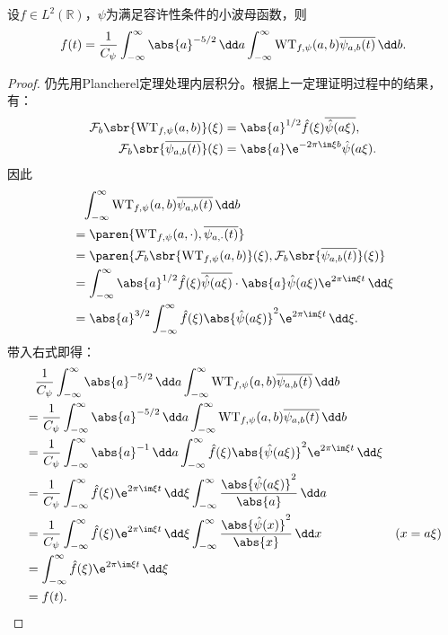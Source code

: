 \begin{theorem}[小波变换反演公式]
    设$f\in L^2(\mathbb{R})$，$\psi$为满足容许性条件的小波母函数，则
    \begin{equation}
        f(t)=\frac{1}{C_{\psi}}\int_{-\infty}^{\infty}\abs{a}^{-5/2}\,\dd a\int_{-\infty}^{\infty}\mathrm{WT}_{f,\psi}(a,b)\overline{\psi_{a,b}(t)}\,\dd b.
    \end{equation}
\end{theorem}
\begin{proof}
    仍先用Plancherel定理处理内层积分。根据上一定理证明过程中的结果，有：
    \begin{align}
        \mathcal{F}_b\sbr{\mathrm{WT}_{f,\psi}(a,b)}(\xi)&=\abs{a}^{1/2}\hat{f}(\xi)\overline{\hat{\psi}(a\xi)},\\
        \mathcal{F}_b\sbr{\overline{\psi_{a,b}(t)}}(\xi)&=\abs{a}\e^{-2\pi\im\xi b}\hat{\psi}(a\xi).
    \end{align}
    因此
    \begin{align}
        &\phantom{=}\int_{-\infty}^{\infty}\mathrm{WT}_{f,\psi}(a,b)\overline{\psi_{a,b}(t)}\,\dd b\nonumber\\
        &=\paren{\mathrm{WT}_{f,\psi}(a,\cdot),\overline{\psi_{a,\cdot}(t)}}\nonumber\\
        &=\paren{\mathcal{F}_b\sbr{\mathrm{WT}_{f,\psi}(a,b)}(\xi),\mathcal{F}_b\sbr{\overline{\psi_{a,b}(t)}}(\xi)}\nonumber\\
        &=\int_{-\infty}^{\infty}\abs{a}^{1/2}\hat{f}(\xi)\overline{\hat{\psi}(a\xi)}\cdot\abs{a}\hat{\psi}(a\xi)\e^{2\pi\im\xi t}\,\dd\xi\nonumber\\
        &=\abs{a}^{3/2}\int_{-\infty}^{\infty}\hat{f}(\xi)\abs{\hat{\psi}(a\xi)}^2\e^{2\pi\im\xi t}\,\dd\xi.
    \end{align}
    带入右式即得：
    \begin{align}
        &\phantom{=}\frac{1}{C_{\psi}}\int_{-\infty}^{\infty}\abs{a}^{-5/2}\,\dd a\int_{-\infty}^{\infty}\mathrm{WT}_{f,\psi}(a,b)\overline{\psi_{a,b}(t)}\,\dd b\nonumber\\
        &=\frac{1}{C_{\psi}}\int_{-\infty}^{\infty}\abs{a}^{-5/2}\,\dd a\int_{-\infty}^{\infty}\mathrm{WT}_{f,\psi}(a,b)\overline{\psi_{a,b}(t)}\,\dd b\nonumber\\
        &=\frac{1}{C_{\psi}}\int_{-\infty}^{\infty}\abs{a}^{-1}\,\dd a\int_{-\infty}^{\infty}\hat{f}(\xi)\abs{\hat{\psi}(a\xi)}^2\e^{2\pi\im\xi t}\,\dd\xi\nonumber\\
        &=\frac{1}{C_{\psi}}\int_{-\infty}^{\infty}\hat{f}(\xi)\e^{2\pi\im\xi t}\,\dd\xi\int_{-\infty}^{\infty}\frac{\abs{\hat{\psi}(a\xi)}^2}{\abs{a}}\,\dd a\nonumber\\
        &=\frac{1}{C_{\psi}}\int_{-\infty}^{\infty}\hat{f}(\xi)\e^{2\pi\im\xi t}\,\dd\xi\int_{-\infty}^{\infty}\frac{\abs{\hat{\psi}(x)}^2}{\abs{x}}\,\dd x&(x=a\xi)\nonumber\\
        &=\int_{-\infty}^{\infty}\hat{f}(\xi)\e^{2\pi\im\xi t}\,\dd\xi\nonumber\\
        &=f(t).
    \end{align}
\end{proof}

